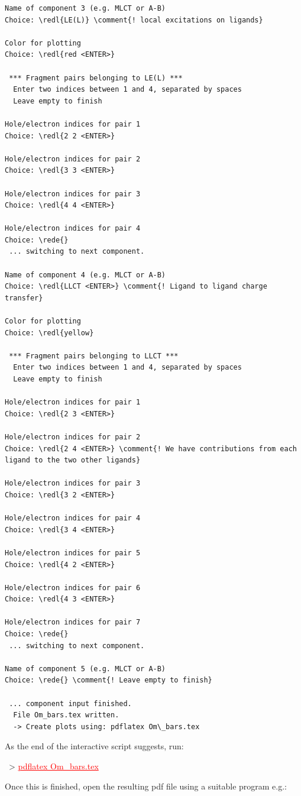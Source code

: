 \documentclass[DIV=12,headings=normal]{scrartcl}
\newcommand{\comment}[1]{\textcolor{blue}{#1}}
\newcommand{\redl}[1]{{\textcolor{red}{\underline{#1}}}}
\newcommand{\rede}[1]{\redl{#1 <ENTER>}}
\newcommand{\comm}[1]{
\small
~> \redl{#1}
\normalsize
}
\begin{document}
\begin{Verbatim}[commandchars=\\\{\}]
Name of component 3 (e.g. MLCT or A-B)
Choice: \redl{LE(L)} \comment{! local excitations on ligands}

Color for plotting
Choice: \redl{red <ENTER>}

 *** Fragment pairs belonging to LE(L) ***
  Enter two indices between 1 and 4, separated by spaces
  Leave empty to finish

Hole/electron indices for pair 1
Choice: \redl{2 2 <ENTER>}

Hole/electron indices for pair 2
Choice: \redl{3 3 <ENTER>}

Hole/electron indices for pair 3
Choice: \redl{4 4 <ENTER>}

Hole/electron indices for pair 4
Choice: \rede{}
 ... switching to next component.
 
Name of component 4 (e.g. MLCT or A-B)
Choice: \redl{LLCT <ENTER>} \comment{! Ligand to ligand charge transfer}

Color for plotting
Choice: \redl{yellow}

 *** Fragment pairs belonging to LLCT ***
  Enter two indices between 1 and 4, separated by spaces
  Leave empty to finish

Hole/electron indices for pair 1
Choice: \redl{2 3 <ENTER>}

Hole/electron indices for pair 2
Choice: \redl{2 4 <ENTER>} \comment{! We have contributions from each ligand to the two other ligands}

Hole/electron indices for pair 3
Choice: \redl{3 2 <ENTER>}

Hole/electron indices for pair 4
Choice: \redl{3 4 <ENTER>}

Hole/electron indices for pair 5
Choice: \redl{4 2 <ENTER>}

Hole/electron indices for pair 6
Choice: \redl{4 3 <ENTER>}

Hole/electron indices for pair 7
Choice: \rede{}
 ... switching to next component.

Name of component 5 (e.g. MLCT or A-B)
Choice: \rede{} \comment{! Leave empty to finish}

 ... component input finished.
  File Om_bars.tex written.
  -> Create plots using: pdflatex Om\_bars.tex
\end{Verbatim}
\normalsize

As the end of the interactive script suggests, run:
\comm{pdflatex Om\_bars.tex}

Once this is finished, open the resulting pdf file using a suitable program e.g.:
\end{document}
